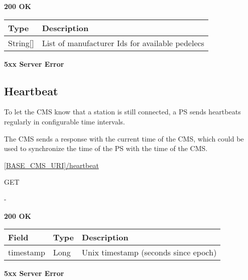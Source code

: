  \textbf{200 OK}

\begin{tabularx}{\linewidth}{ | l | X | }
  \hline
  \rowcolor{table-head}
  Type & Description \\
  \hline
  	String[] & List of manufacturer Ids for available pedelecs \\	
  \hline
\end{tabularx}

 \textbf{5xx Server Error}

\subsection{Heartbeat}

To let the \acs{CMS} know that a station is still connected, a \acs{PS} sends heartbeats regularly in configurable time intervals.

The \acs{CMS} sends a response with the current time of the \acs{CMS}, which could be used to synchronize the time of the \acs{PS} with the time of the \acs{CMS}.

 \url{[BASE_CMS_URI]/heartbeat}

 GET

 -

 \textbf{200 OK}

\begin{tabularx}{\linewidth}{ | l | l | X | }
  \hline
  \rowcolor{table-head}
  Field & Type & Description \\
  \hline
  	timestamp & Long			& Unix timestamp (seconds since epoch) \\	
  \hline
\end{tabularx}


 \textbf{5xx Server Error}
